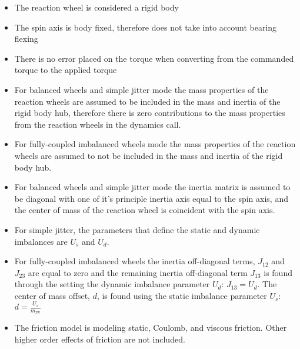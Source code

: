 \begin{itemize}
	\item The reaction wheel is considered a rigid body
	\item The spin axis is body fixed, therefore does not take into account bearing flexing
	\item There is no error placed on the torque when converting from the commanded torque to the applied torque
	\item For balanced wheels and simple jitter mode the mass properties of the reaction wheels are assumed to be included in the mass and inertia of the rigid body hub, therefore there is zero contributions to the mass properties from the reaction wheels in the dynamics call. 
	\item For fully-coupled imbalanced wheels mode the mass properties of the reaction wheels are assumed to not be included in the mass and inertia of the rigid body hub. 
	\item For balanced wheels and simple jitter mode the inertia matrix is assumed to be diagonal with one of it's principle inertia axis equal to the spin axis, and the center of mass of the reaction wheel is coincident with the spin axis. 
	\item For simple jitter, the parameters that define the static and dynamic imbalances are $U_s$ and $U_d$.
	\item For fully-coupled imbalanced wheels the inertia off-diagonal terms, $J_{12}$ and $J_{23}$ are equal to zero and the remaining inertia off-diagonal term $J_{13}$ is found through the setting the dynamic imbalance parameter $U_d$: $J_{13} = U_d$. The center of mass offset, $d$, is found using the static imbalance parameter $U_s$: $d = \frac{U_s}{m_{\text{rw}}}$
	\item The friction model is modeling static, Coulomb, and viscous friction. Other higher order effects of friction are not included. 
\end{itemize}